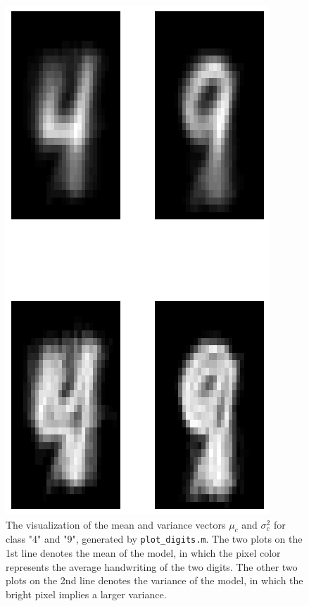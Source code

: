 \documentclass{article}
\begin{document}
\begin{figure}[htb]
\centering
\includegraphics[width=\textwidth]{2-4-digit.eps}
\caption{The visualization of the mean and variance vectors $\mu_c$ and $\sigma_c^2$ for class "4" and "9", generated by \texttt{plot\_digits.m}. The two plots on the 1st line denotes the mean of the model, in which the pixel color represents the average handwriting of the two digits. The other two plots on the 2nd line denotes the variance of the model, in which the bright pixel implies a larger variance.
\label{fig:2-4-digit}}
\end{figure}
\end{document}
